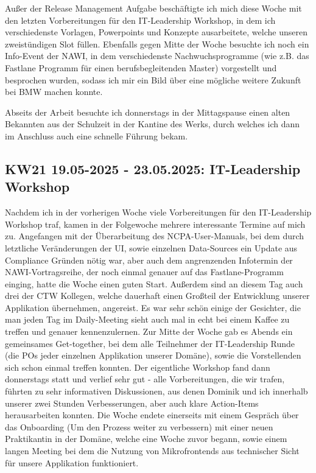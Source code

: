 Außer der Release Management Aufgabe beschäftigte ich mich diese Woche mit den letzten Vorbereitungen für den IT-Leadership Workshop, in dem ich verschiedenste Vorlagen, Powerpoints und Konzepte ausarbeitete, welche unseren zweistündigen Slot füllen.
Ebenfalls gegen Mitte der Woche besuchte ich noch ein Info-Event der \ac{NAWI}, in dem verschiedenste Nachwuchsprogramme (wie z.B. das Fastlane Programm für einen berufsbegleitenden Master) vorgestellt und besprochen wurden, sodass ich mir ein Bild über eine mögliche weitere Zukunft bei BMW machen konnte.

Abseits der Arbeit besuchte ich donnerstags in der Mittagspause einen alten Bekannten aus der Schulzeit in der Kantine des Werks, durch welches ich dann im Anschluss auch eine schnelle Führung bekam.



\subsection{KW21 19.05-2025 - 23.05.2025: IT-Leadership Workshop}
Nachdem ich in der vorherigen Woche viele Vorbereitungen für den IT-Leadership Workshop traf, kamen in der Folgewoche mehrere interessante Termine auf mich zu.
Angefangen mit der Überarbeitung des \ac{NCPA}-User-Manuals, bei dem durch letztliche Veränderungen der UI, sowie einzelnen Data-Sources ein Update aus Compliance Gründen nötig war, aber auch dem angrenzenden Infotermin der \ac{NAWI}-Vortragsreihe, der noch einmal genauer auf das Fastlane-Programm einging, hatte die Woche einen guten Start.
Außerdem sind an diesem Tag auch drei der \ac{CTW} Kollegen, welche dauerhaft einen Großteil der Entwicklung unserer Applikation übernehmen, angereist.
Es war sehr schön einige der Gesichter, die man jeden Tag im Daily-Meeting sieht auch mal in echt bei einem Kaffee zu treffen und genauer kennenzulernen.
Zur Mitte der Woche gab es Abends ein gemeinsames Get-together, bei dem alle Teilnehmer der IT-Leadership Runde (die \acp{PO} jeder einzelnen Applikation unserer Domäne), sowie die Vorstellenden sich schon einmal treffen konnten.
Der eigentliche Workshop fand dann donnerstags statt und verlief sehr gut - alle Vorbereitungen, die wir trafen, führten zu sehr informativen Diskussionen, aus denen Dominik und ich innerhalb unserer zwei Stunden Verbesserungen, aber auch klare Action-Items herausarbeiten konnten.
Die Woche endete einerseits mit einem Gespräch über das Onboarding (Um den Prozess weiter zu verbessern) mit einer neuen Praktikantin in der Domäne, welche eine Woche zuvor begann, sowie einem langen Meeting bei dem die Nutzung von Mikrofrontends aus technischer Sicht für unsere Applikation funktioniert.


